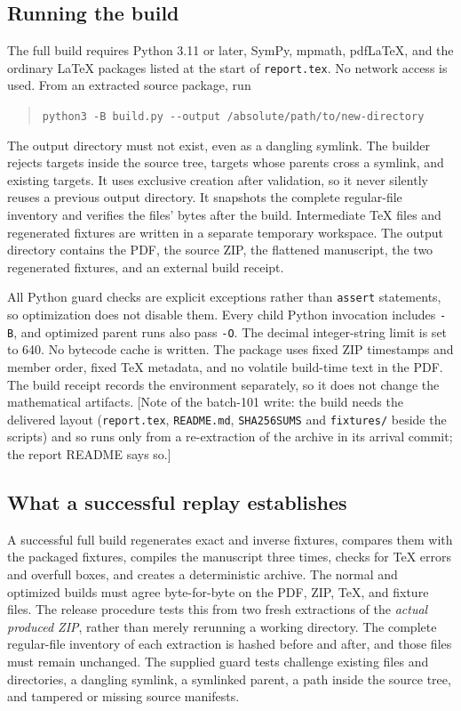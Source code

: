 \documentclass[11pt]{article}
\numberwithin{equation}{section}
\theoremstyle{definition}
\theoremstyle{remark}
\theoremstyle{definition}
\begin{document}
\subsection{Running the build}
The full build requires Python 3.11 or later, SymPy, mpmath, pdfLaTeX, and
the ordinary LaTeX packages listed at the start of \texttt{report.tex}.
No network access is used. From an extracted source package, run
\begin{quote}
\verb|python3 -B build.py --output /absolute/path/to/new-directory|
\end{quote}
The output directory must not exist, even as a dangling symlink. The builder
rejects targets inside the source tree, targets whose parents cross a
symlink, and existing targets. It uses exclusive creation after validation,
so it never silently reuses a previous output directory. It snapshots the
complete regular-file inventory and verifies the files' bytes after the
build. Intermediate TeX files and regenerated fixtures are written in a
separate temporary workspace. The output directory contains the PDF, the
source ZIP, the flattened manuscript, the two regenerated fixtures, and an
external build receipt.

All Python guard checks are explicit exceptions rather than
\texttt{assert} statements, so optimization does not disable them. Every
child Python invocation includes \texttt{-B}, and optimized parent runs
also pass \texttt{-O}. The decimal integer-string limit is set to 640.
No bytecode cache is written. The package uses fixed ZIP timestamps and
member order, fixed TeX metadata, and no volatile build-time text in the
PDF. The build receipt records the environment separately, so it does not
change the mathematical artifacts. [Note of the batch-101 write: the build
needs the delivered layout (\texttt{report.tex}, \texttt{README.md},
\texttt{SHA256SUMS} and \texttt{fixtures/} beside the scripts) and so runs
only from a re-extraction of the archive in its arrival commit; the report
README says so.]

\subsection{What a successful replay establishes}
A successful full build regenerates exact and inverse fixtures, compares
them with the packaged fixtures, compiles the manuscript three times, checks
for TeX errors and overfull boxes, and creates a deterministic archive. The
normal and optimized builds must agree byte-for-byte on the PDF, ZIP, TeX,
and fixture files. The release procedure tests this from two fresh
extractions of the \emph{actual produced ZIP}, rather than merely rerunning
a working directory. The complete regular-file inventory of each extraction
is hashed before and after, and those files must remain unchanged. The
supplied guard tests challenge existing files and directories, a dangling
symlink, a symlinked parent, a path inside the source tree, and tampered or
missing source manifests.
\end{document}
